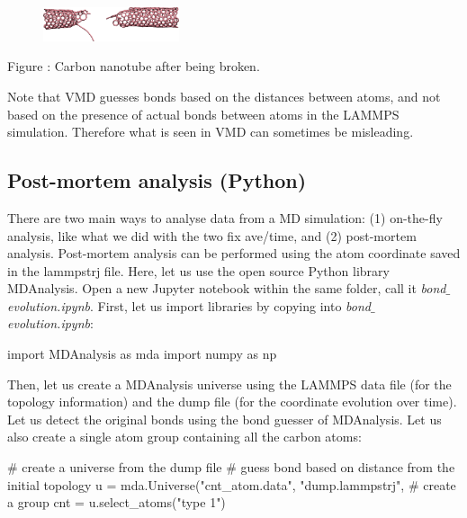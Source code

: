 \hspace{-0.45cm}\begin{figure}
\includegraphics[width=4cm]{tutorials/level1/breaking-a-carbon-nanotube/deformed-light.png}
\end{figure}

\noindent Figure : Carbon nanotube after being broken.

\begin{tcolorbox}[colback=mylightblue!5!white,colframe=mylightblue!75!black,title=About bonds in VMD]
Note that VMD guesses bonds based on the distances
between atoms, and not based on the presence of actual
bonds between atoms in the LAMMPS simulation. Therefore what is seen
in VMD can sometimes be misleading.
\end{tcolorbox}

\noindent \subsection{Post-mortem analysis (Python)}

There are two main ways to analyse data from a MD simulation:
(1) on-the-fly analysis, like what we did with the two fix ave/time,
and (2) post-mortem analysis. Post-mortem analysis can be performed using
the atom coordinate saved in the lammpstrj file.
Here, let us use the open source Python library MDAnalysis.
Open a new Jupyter notebook within the same folder, call it
\textit{bond$\_$evolution.ipynb}. First, let us import libraries
by copying into \textit{bond$\_$evolution.ipynb}:

\begin{lcverbatim}
import MDAnalysis as mda
import numpy as np
\end{lcverbatim}

\noindent Then, let us create a MDAnalysis universe using the LAMMPS
data file (for the topology information) and the dump file 
(for the coordinate evolution over time). Let us detect the
original bonds using the bond guesser of MDAnalysis. Let us also create 
a single atom group containing all the carbon atoms: 

\begin{lcverbatim}
# create a universe from the dump file
# guess bond based on distance from the initial topology
u = mda.Universe("cnt_atom.data", "dump.lammpstrj",
# create a group
cnt = u.select_atoms("type 1")
\end{lcverbatim}

